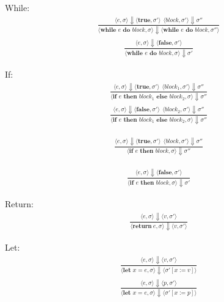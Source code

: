 \documentclass[12pt]{article}
\begin{document}
	
	While:
	\begin{align*}
		\frac{\langle e, \sigma \rangle\Downarrow \langle \textbf{true}, \sigma' \rangle \ \
		\langle block, \sigma' \rangle\Downarrow \sigma''}
		{\langle \textbf{while } e \textbf{ do } block, \sigma \rangle\Downarrow \langle \textbf{while } e \textbf{ do } block, \sigma'' \rangle}
	\end{align*}
	\begin{align*}
		\frac{\langle e, \sigma \rangle\Downarrow \langle \textbf{false}, \sigma' \rangle}
		{\langle \textbf{while } e \textbf{ do } block, \sigma \rangle\Downarrow \sigma'}
	\end{align*}

	If:
	\begin{align*}
		\frac{\langle e, \sigma \rangle\Downarrow \langle \textbf{true}, \sigma' \rangle \ \
		\langle block_1, \sigma' \rangle\Downarrow \sigma''}
		{\langle \textbf{if } e \textbf{ then } block_1 \textbf{ else } block_2, \sigma \rangle\Downarrow \sigma''}
	\end{align*}
	\begin{align*}
		\frac{\langle e, \sigma \rangle\Downarrow \langle \textbf{false}, \sigma' \rangle \ \
		\langle block_2, \sigma' \rangle\Downarrow \sigma''}
		{\langle \textbf{if } e \textbf{ then } block_1 \textbf{ else } block_2, \sigma \rangle\Downarrow \sigma''}
	\end{align*}
	
	\begin{align*}
		\frac{\langle e, \sigma \rangle\Downarrow \langle \textbf{true}, \sigma' \rangle \ \ 
		\langle block, \sigma' \rangle\Downarrow \sigma''}
		{\langle \textbf{if } e \textbf{ then } block, \sigma \rangle\Downarrow \sigma''}
	\end{align*}

	\begin{align*}
		\frac{\langle e, \sigma \rangle\Downarrow \langle \textbf{false}, \sigma' \rangle}
		{\langle \textbf{if } e \textbf{ then } block, \sigma \rangle\Downarrow \sigma'}
	\end{align*}


	Return:
	\begin{align*}
		\frac{\langle e, \sigma \rangle\Downarrow \langle v, \sigma' \rangle}
		{\langle \textbf{return}\ e, \sigma \rangle\Downarrow \langle v, \sigma' \rangle}
	\end{align*}

	Let:
	\begin{align*}
		\frac{\langle e, \sigma \rangle\Downarrow \langle v, \sigma' \rangle}
		{\langle \textbf{let } x = e, \sigma \rangle\Downarrow \langle \sigma' [x := v] \rangle}
	\end{align*}
	\begin{align*}
		\frac{\langle e, \sigma \rangle\Downarrow \langle p, \sigma' \rangle}
		{\langle \textbf{let } x = e, \sigma \rangle\Downarrow \langle \sigma' [x := p] \rangle}
	\end{align*}
\end{document}
